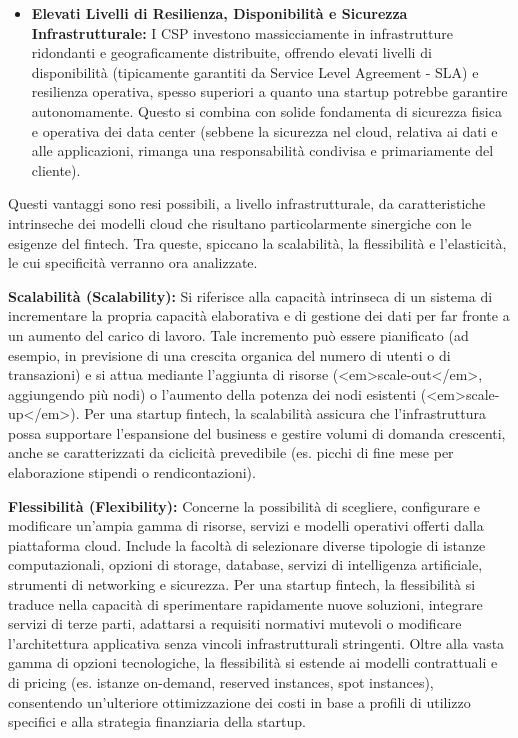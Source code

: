 \begin{itemize}
\item \textbf{Elevati Livelli di Resilienza, Disponibilità e Sicurezza Infrastrutturale:} I CSP investono massicciamente in infrastrutture ridondanti e geograficamente distribuite, offrendo elevati livelli di disponibilità (tipicamente garantiti da Service Level Agreement - SLA) e resilienza operativa, spesso superiori a quanto una startup potrebbe garantire autonomamente. Questo si combina con solide fondamenta di sicurezza fisica e operativa dei data center (sebbene la sicurezza nel cloud, relativa ai dati e alle applicazioni, rimanga una responsabilità condivisa e primariamente del cliente).
\end{itemize}

Questi vantaggi sono resi possibili, a livello infrastrutturale, da caratteristiche intrinseche dei modelli cloud che risultano particolarmente sinergiche con le esigenze del fintech. Tra queste, spiccano la scalabilità, la flessibilità e l'elasticità, le cui specificità verranno ora analizzate.

\textbf{Scalabilità (Scalability):} Si riferisce alla capacità intrinseca di un sistema di incrementare la propria capacità elaborativa e di gestione dei dati per far fronte a un aumento del carico di lavoro. Tale incremento può essere pianificato (ad esempio, in previsione di una crescita organica del numero di utenti o di transazioni) e si attua mediante l'aggiunta di risorse (<em>scale-out</em>, aggiungendo più nodi) o l'aumento della potenza dei nodi esistenti (<em>scale-up</em>). Per una startup fintech, la scalabilità assicura che l'infrastruttura possa supportare l'espansione del business e gestire volumi di domanda crescenti, anche se caratterizzati da ciclicità prevedibile (es. picchi di fine mese per elaborazione stipendi o rendicontazioni).

\textbf{Flessibilità (Flexibility):} Concerne la possibilità di scegliere, configurare e modificare un'ampia gamma di risorse, servizi e modelli operativi offerti dalla piattaforma cloud. Include la facoltà di selezionare diverse tipologie di istanze computazionali, opzioni di storage, database, servizi di intelligenza artificiale, strumenti di networking e sicurezza. Per una startup fintech, la flessibilità si traduce nella capacità di sperimentare rapidamente nuove soluzioni, integrare servizi di terze parti, adattarsi a requisiti normativi mutevoli o modificare l'architettura applicativa senza vincoli infrastrutturali stringenti. Oltre alla vasta gamma di opzioni tecnologiche, la flessibilità si estende ai modelli contrattuali e di pricing (es. istanze on-demand, reserved instances, spot instances), consentendo un'ulteriore ottimizzazione dei costi in base a profili di utilizzo specifici e alla strategia finanziaria della startup.


